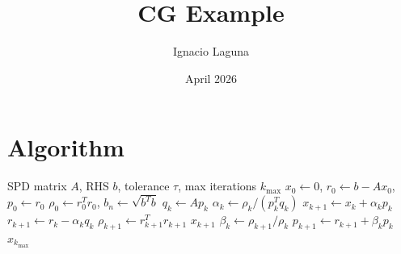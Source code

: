\documentclass{article}
\title{CG Example}
\author{Ignacio Laguna}
\date{April 2026}
\begin{document}
\maketitle

\section{Algorithm}

\begin{algorithm}[th!]
\caption{Conjugate Gradient (FP32 baseline)}
\begin{algorithmic}[1]
\Require SPD matrix $A$, RHS $b$, tolerance $\tau$, max iterations $k_{\max}$
\State $x_0 \gets 0$, $r_0 \gets b - A x_0$, $p_0 \gets r_0$
\State $\rho_0 \gets r_0^T r_0$, $b_n \gets \sqrt{b^T b}$
  \State $q_k \gets A p_k$
  \State $\alpha_k \gets \rho_k / (p_k^T q_k)$
  \State $x_{k+1} \gets x_k + \alpha_k p_k$
  \State $r_{k+1} \gets r_k - \alpha_k q_k$
  \State $\rho_{k+1} \gets r_{k+1}^T r_{k+1}$
    \State \Return $x_{k+1}$
  \EndIf
  \State $\beta_k \gets \rho_{k+1} / \rho_k$
  \State $p_{k+1} \gets r_{k+1} + \beta_k p_k$
\EndFor
\State \Return $x_{k_{\max}}$
\end{algorithmic}
\end{algorithm}
\end{document}
